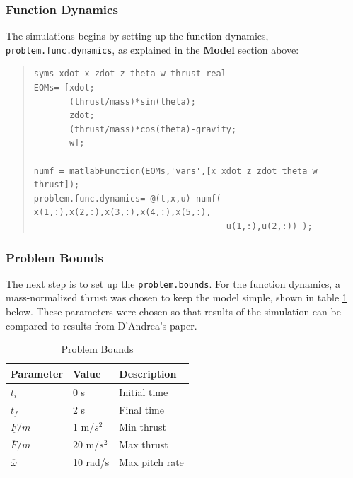 \documentclass[12pt]{article}
\begin{document}
\subsubsection{Function Dynamics}
The simulations begins by setting up the function dynamics, \lstinline!problem.func.dynamics!, as explained in the \textbf{Model} section above: 
\begin{quote}
\begin{lstlisting}
syms xdot x zdot z theta w thrust real
EOMs= [xdot;
       (thrust/mass)*sin(theta);
       zdot;
       (thrust/mass)*cos(theta)-gravity;
       w];

numf = matlabFunction(EOMs,'vars',[x xdot z zdot theta w thrust]);
problem.func.dynamics= @(t,x,u) numf( x(1,:),x(2,:),x(3,:),x(4,:),x(5,:),
                                      u(1,:),u(2,:)) );

\end{lstlisting}
\end{quote}

\subsubsection{Problem Bounds}
The next step is to set up the \lstinline!problem.bounds!. For the function dynamics, a mass-normalized thrust was chosen to keep the model simple, shown in table \ref{Problem Bounds} below. These parameters were chosen so that results of the simulation can be compared to results from D'Andrea's paper\cite{D'Andrea}. 

\begin{table}[H]
\begin{center}
\begin{tabular}{ |p{2.5cm}||p{2cm}||p{3cm}| }

 \hline
 Parameter & Value & Description\\
 \hline
 $t_{i}$   & 0 s  & Initial time\\
 $t_{f}$  & 2 s  & Final time\\
 $\underline{F}/m$ & 1 m/$s^{2}$ & Min thrust\\
 $\overline{F}/m$ & 20 m/$s^{2}$ & Max thrust\\
 $\overline{\omega}$ & 10 rad/s & Max pitch rate \\
 \hline
\end{tabular}
\caption{Problem Bounds }
\label{Problem Bounds}
\end{center}
\end{table}

\clearpage
\end{document}
